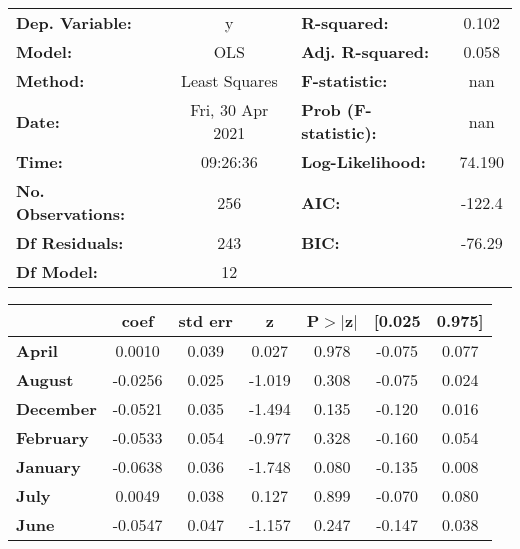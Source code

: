 \begin{center}
\begin{tabular}{lclc}
\toprule
\textbf{Dep. Variable:}    &        y         & \textbf{  R-squared:         } &     0.102   \\
\textbf{Model:}            &       OLS        & \textbf{  Adj. R-squared:    } &     0.058   \\
\textbf{Method:}           &  Least Squares   & \textbf{  F-statistic:       } &       nan   \\
\textbf{Date:}             & Fri, 30 Apr 2021 & \textbf{  Prob (F-statistic):} &      nan    \\
\textbf{Time:}             &     09:26:36     & \textbf{  Log-Likelihood:    } &    74.190   \\
\textbf{No. Observations:} &         256      & \textbf{  AIC:               } &    -122.4   \\
\textbf{Df Residuals:}     &         243      & \textbf{  BIC:               } &    -76.29   \\
\textbf{Df Model:}         &          12      & \textbf{                     } &             \\
\bottomrule
\end{tabular}
\begin{tabular}{lcccccc}
                   & \textbf{coef} & \textbf{std err} & \textbf{z} & \textbf{P$> |$z$|$} & \textbf{[0.025} & \textbf{0.975]}  \\
\midrule
\textbf{April}     &       0.0010  &        0.039     &     0.027  &         0.978        &       -0.075    &        0.077     \\
\textbf{August}    &      -0.0256  &        0.025     &    -1.019  &         0.308        &       -0.075    &        0.024     \\
\textbf{December}  &      -0.0521  &        0.035     &    -1.494  &         0.135        &       -0.120    &        0.016     \\
\textbf{February}  &      -0.0533  &        0.054     &    -0.977  &         0.328        &       -0.160    &        0.054     \\
\textbf{January}   &      -0.0638  &        0.036     &    -1.748  &         0.080        &       -0.135    &        0.008     \\
\textbf{July}      &       0.0049  &        0.038     &     0.127  &         0.899        &       -0.070    &        0.080     \\
\textbf{June}      &      -0.0547  &        0.047     &    -1.157  &         0.247        &       -0.147    &        0.038     \\

\end{tabular}
\end{center}
